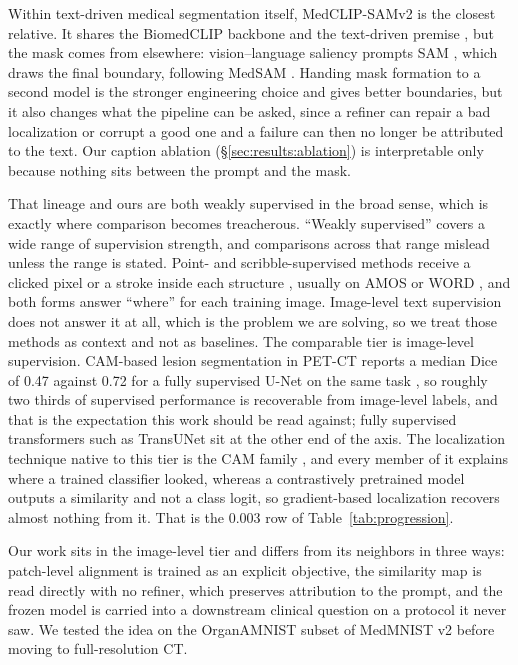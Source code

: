 \documentclass[10pt]{article}
\begin{document}
Within text-driven medical segmentation itself, MedCLIP-SAMv2 is the closest
relative. It shares the BiomedCLIP backbone and the
text-driven premise \cite{koleilat2025medclipsamv2, koleilat2024medclipsam}, but
the mask comes from elsewhere: vision--language saliency prompts SAM
\cite{kirillov2023sam}, which draws the final boundary, following MedSAM
\cite{ma2024medsam}. Handing mask formation to a second model is the stronger
engineering choice and gives better boundaries, but it also changes what the
pipeline can be asked, since a refiner can repair a bad localization or corrupt a
good one and a failure can then no longer be attributed to the text. Our caption
ablation (\S\ref{sec:results:ablation}) is interpretable only because nothing sits
between the prompt and the mask.

That lineage and ours are both weakly supervised in the broad sense, which is
exactly where comparison becomes treacherous.
``Weakly supervised'' covers a wide range of supervision strength, and comparisons
across that range mislead unless the range is stated. Point- and
scribble-supervised methods receive a clicked pixel or a stroke inside each
structure \cite{jiang2024probabilistic}, usually on AMOS \cite{ji2022amos} or WORD
\cite{luo2022word}, and both forms answer ``where'' for each training image.
Image-level text supervision does not answer it at all, which is the problem we
are solving, so we treat those methods as context and not as baselines. The
comparable tier is image-level supervision. CAM-based lesion segmentation in
PET-CT reports a median Dice of 0.47 against 0.72 for a fully supervised U-Net
\cite{ronneberger2015unet} on the same task \cite{fruh2021petct}, so roughly two
thirds of supervised performance is recoverable from image-level labels, and that
is the expectation this work should be read against; fully supervised transformers
such as TransUNet \cite{chen2021transunet} sit at the other end of the axis. The
localization technique native to this tier is the CAM family \cite{zhou2016cam,
selvaraju2017gradcam, chattopadhay2018gradcampp}, and every member of it explains
where a trained classifier looked, whereas a contrastively pretrained model
outputs a similarity and not a class logit, so gradient-based localization
recovers almost nothing from it. That is the 0.003 row of
Table~\ref{tab:progression}.

Our work sits in the image-level tier and differs from its neighbors in three
ways: patch-level alignment is trained as an explicit objective, the similarity
map is read directly with no refiner, which preserves attribution to the prompt,
and the frozen model is carried into a downstream clinical question on a protocol
it never saw. We tested the idea on the OrganAMNIST subset of MedMNIST v2
\cite{yang2023medmnist} before moving to full-resolution CT.
\end{document}
